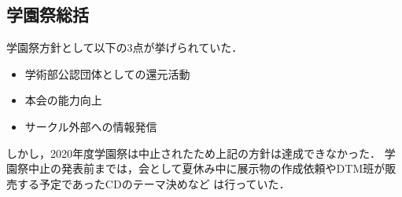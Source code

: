 \subsection*{学園祭総括}

学園祭方針として以下の3点が挙げられていた．
\begin{itemize}
    \item 学術部公認団体としての還元活動
    \item 本会の能力向上
    \item サークル外部への情報発信
\end{itemize}
しかし，2020年度学園祭は中止されたため上記の方針は達成できなかった．
学園祭中止の発表前までは，会として夏休み中に展示物の作成依頼やDTM班が販売する予定であったCDのテーマ決めなど
は行っていた．
